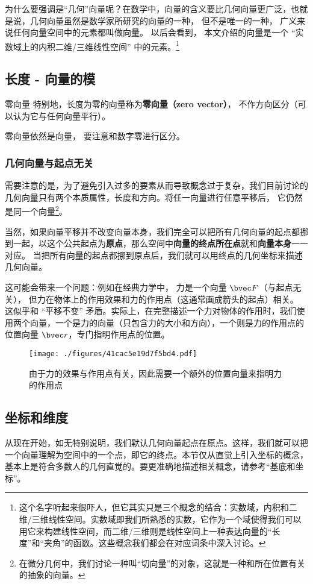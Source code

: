 为什么要强调是“几何”向量呢？在数学中，向量的含义要比几何向量更广泛，也就是说，几何向量虽然是数学家所研究的向量的一种， 但不是唯一的一种， 广义来说任何向量空间中的元素都叫做向量。 以后会看到， 本文介绍的向量是一个 “实数域上的内积二维/三维线性空间” 中的元素。\footnote{这个名字听起来很吓人，但它其实只是三个概念的结合：实数域，内积和二维/三维线性空间。实数域即我们所熟悉的实数，它作为一个域使得我们可以用它来构建线性空间，而二维/三维则是线性空间上一种表达向量的“长度”和“夹角”的函数。这些概念我们都会在对应词条中深入讨论。}

\subsection{长度 - 向量的模}

\begin{definition}{零向量}
特别地，长度为零的向量称为\textbf{零向量（zero vector）}， 不作方向区分（可以认为它与任何向量平行）。
\end{definition}
零向量依然是向量， 要注意和数字零进行区分。


\subsubsection{几何向量与起点无关}
需要注意的是，为了避免引入过多的要素从而导致概念过于复杂，我们目前讨论的几何向量只有两个本质属性，长度和方向。将任一向量进行任意平移后， 它仍然是同一个向量\footnote{在微分几何中，我们讨论一种叫“切向量”的对象，这就是一种和所在位置有关的抽象的向量。}。

当然，如果向量平移并不改变向量本身，我们完全可以把所有几何向量的起点都挪到一起，以这个公共起点为\textbf{原点}，那么空间中\textbf{向量的终点所在点}就和\textbf{向量本身}一一对应。 当把所有向量的起点都挪到原点后，我们就可以用终点的几何坐标来描述几何向量。

这可能会带来一个问题：例如在经典力学中， 力是一个向量 $\bvec F$（与起点无关）， 但力在物体上的作用效果和力的作用点（这通常画成箭头的起点）相关。 这似乎和 “平移不变” 矛盾。实际上，在完整描述一个力对物体的作用时，我们使用两个向量，一个是力的向量（只包含力的大小和方向），一个则是力的作用点的位置向量 $\bvec r$，专门指明作用点的位置。
\begin{figure}[ht]
\centering
\texttt{[image: ./figures/41cac5e19d7f5bd4.pdf]}
\caption{由于力的效果与作用点有关，因此需要一个额外的位置向量来指明力的作用点} \label{fig_GVec_5}
\end{figure}

\subsection{坐标和维度}
从现在开始，如无特别说明，我们默认几何向量起点在原点。这样，我们就可以把一个向量理解为空间中的一个点，即它的终点。本节仅从直觉上引入坐标的概念，基本上是符合多数人的几何直觉的。要更准确地描述相关概念，请参考“基底和坐标”。

